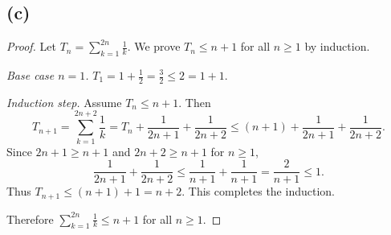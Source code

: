 \documentclass[12pt,a4paper]{article}
\theoremstyle{definition}
\theoremstyle{remark}
\begin{document}




\subsection*{(c)}
\begin{proof}
Let \(T_n = \sum_{k=1}^{2n} \frac{1}{k}\). We prove \(T_n \le n+1\) for all \(n\ge 1\) by induction.

\emph{Base case \(n=1\).} \(T_1 = 1 + \tfrac12 = \tfrac32 \le 2 = 1+1\).

\emph{Induction step.} Assume \(T_n \le n+1\). Then
\[
T_{n+1}
= \sum_{k=1}^{2n+2} \frac{1}{k}
= T_n + \frac{1}{2n+1} + \frac{1}{2n+2}
\le (n+1) + \frac{1}{2n+1} + \frac{1}{2n+2}.
\]
Since \(2n+1 \ge n+1\) and \(2n+2 \ge n+1\) for \(n\ge 1\),
\[
\frac{1}{2n+1} + \frac{1}{2n+2}
\le \frac{1}{n+1} + \frac{1}{n+1}
= \frac{2}{n+1} \le 1.
\]
Thus \(T_{n+1} \le (n+1) + 1 = n+2\). This completes the induction.

Therefore \(\displaystyle \sum_{k=1}^{2n} \frac{1}{k} \le n+1\) for all \(n\ge 1\).
\end{proof}
\end{document}
